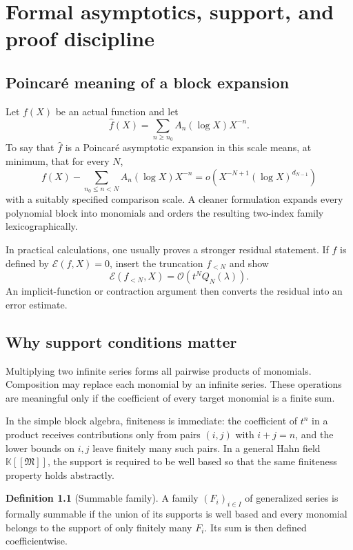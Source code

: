 \documentclass[11pt,openany]{book}
\theoremstyle{definition}
\newtheorem{definition}{Definition}[chapter]
\theoremstyle{plain}
\theoremstyle{remark}
\newcommand{\K}{\mathbb{K}}
\newcommand{\M}{\mathfrak{M}}
\newcommand{\bigO}{\mathcal{O}}
\begin{document}
\chapter{Formal asymptotics, support, and proof discipline}\label{ch:support}

\section{Poincar\'e meaning of a block expansion}
Let \(f(X)\) be an actual function and let
\[
 \widehat f(X)=\sum_{n\ge n_0}A_n(\log X)X^{-n}.
\]
To say that \(\widehat f\) is a Poincar\'e asymptotic expansion in this scale means, at minimum, that for every \(N\),
\begin{equation}\label{eq:block-asymptotic}
 f(X)-\sum_{n_0\le n<N}A_n(\log X)X^{-n}
 =o\!\left(X^{-N+1}(\log X)^{d_{N-1}}\right)
\end{equation}
with a suitably specified comparison scale. A cleaner formulation expands every polynomial block into monomials and orders the resulting two-index family lexicographically.

In practical calculations, one usually proves a stronger residual statement. If \(f\) is defined by \(\mathcal E(f,X)=0\), insert the truncation \(f_{<N}\) and show
\[
 \mathcal E(f_{<N},X)=\bigO(t^N Q_N(\lambda)).
\]
An implicit-function or contraction argument then converts the residual into an error estimate.

\section{Why support conditions matter}
Multiplying two infinite series forms all pairwise products of monomials. Composition may replace each monomial by an infinite series. These operations are meaningful only if the coefficient of every target monomial is a finite sum.

In the simple block algebra, finiteness is immediate: the coefficient of \(t^n\) in a product receives contributions only from pairs \((i,j)\) with \(i+j=n\), and the lower bounds on \(i,j\) leave finitely many such pairs. In a general Hahn field \(\K[[\M]]\), the support is required to be well based so that the same finiteness property holds abstractly.

\begin{definition}[Summable family]
A family \((F_i)_{i\in I}\) of generalized series is formally summable if the union of its supports is well based and every monomial belongs to the support of only finitely many \(F_i\). Its sum is then defined coefficientwise.
\end{definition}
\end{document}
